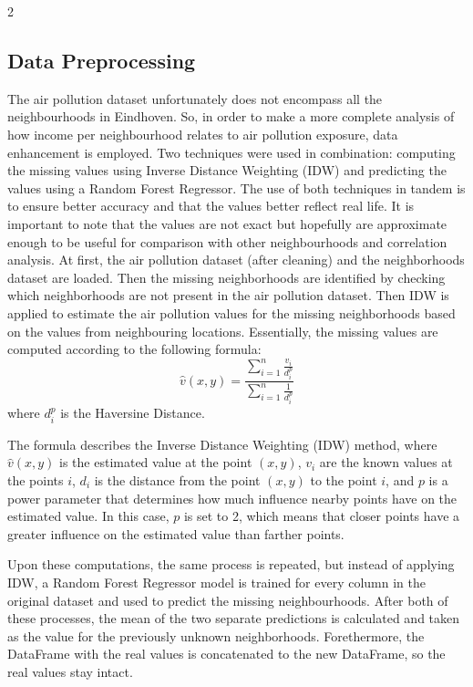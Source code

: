 \documentclass[12pt, a4paper]{article}
\begin{document}
\begin{multicols}{2}
    \subsection{Data Preprocessing}
    The air pollution dataset unfortunately does not encompass all the neighbourhoods in Eindhoven. So, in order to make a more complete analysis of how income per neighbourhood relates to air pollution exposure, data enhancement is employed. Two techniques were used in combination: computing the missing values using Inverse Distance Weighting (IDW) and predicting the values using a Random Forest Regressor. The use of both techniques in tandem is to ensure better accuracy and that the values better reflect real life. It is important to note that the values are not exact but hopefully are approximate enough to be useful for comparison with other neighbourhoods and correlation analysis.
    At first, the air pollution dataset (after cleaning) and the neighborhoods dataset are loaded. Then the missing neighborhoods are identified by checking which neighborhoods are not present in the air pollution dataset. Then IDW is applied to estimate the air pollution values for the missing neighborhoods based on the values from neighbouring locations. Essentially, the missing values are computed according to the following formula: 
    \begin{equation}
        \hat{v}(x, y) = \frac{\sum_{i=1}^n \frac{v_i}{d_i^p}}{\sum_{i=1}^n \frac{1}{d_i^p}}  
    \end{equation}
    where $d_i^p$ is the Haversine Distance.

    The formula describes the Inverse Distance Weighting (IDW) method, where $\hat{v}(x, y)$ is the estimated value at the point $(x, y)$, $v_i$ are the known values at the points $i$, $d_i$ is the distance from the point $(x, y)$ to the point $i$, and $p$ is a power parameter that determines how much influence nearby points have on the estimated value. In this case, $p$ is set to 2, which means that closer points have a greater influence on the estimated value than farther points.

    Upon these computations, the same process is repeated, but instead of applying IDW, a Random Forest Regressor model is trained for every column in the original dataset and used to predict the missing neighbourhoods.
    After both of these processes, the mean of the two separate predictions is calculated and taken as the value for the previously unknown neighborhoods. Forethermore, the DataFrame with the real values is concatenated to the new DataFrame, so the real values stay intact.

\end{multicols}
\end{document}
